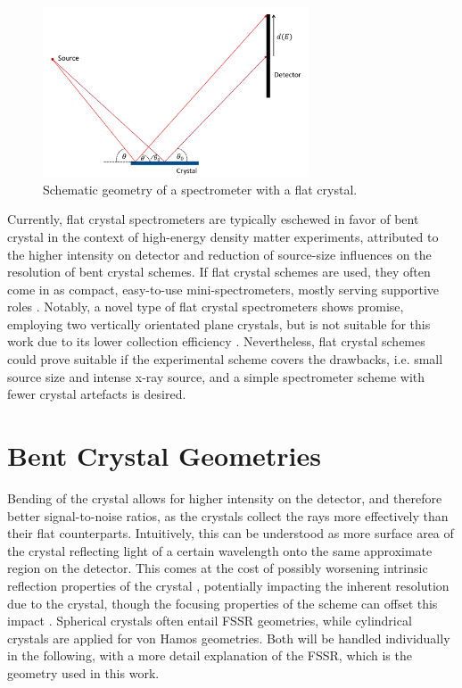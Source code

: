 \begin{figure}[H]
	\centering
	\includegraphics[width = 0.70\textwidth]{Diagrams/Basic_Spectrometer.pdf}
	\caption{Schematic geometry of a spectrometer with a flat crystal.}
	\label{BasicSpec}
\end{figure}

Currently, flat crystal spectrometers are typically eschewed in 
favor of bent 
crystal in the context of high-energy density matter experiments, 
attributed to 
the higher intensity on detector and reduction of source-size 
influences on the 
resolution of bent crystal schemes. If flat crystal schemes are 
used, they 
often come in as compact, easy-to-use mini-spectrometers, mostly 
serving 
supportive roles \citep{renner2019challenges}. Notably, a novel 
type of flat 
crystal spectrometers shows promise, employing two vertically 
orientated plane 
crystals, but is not suitable for this work due to its lower 
collection 
efficiency \citep{renner1999vertical}. Nevertheless, flat 
crystal 
schemes could prove suitable if the experimental scheme covers the 
drawbacks, 
i.e. small source size and intense x-ray source, and a simple 
spectrometer 
scheme with fewer crystal artefacts is desired.

\section{Bent Crystal Geometries}

Bending of the 
crystal allows for higher intensity on the detector, and therefore 
better 
signal-to-noise ratios, as the crystals collect the rays more 
effectively than 
their flat counterparts. Intuitively, this can be understood as more 
surface area of the crystal reflecting light of a certain wavelength 
onto the 
same approximate region on the detector. This comes at the cost of 
possibly 
worsening intrinsic reflection properties of the crystal 
\citep{holzer1998flat}, potentially impacting the inherent resolution due to the 
crystal, 
though the focusing properties of the scheme can 
offset this 
impact \citep{renner2019challenges}. Spherical crystals often entail 
FSSR 
geometries, while cylindrical crystals are applied for von Hamos 
geometries. Both will be handled individually in 
the 
following, with a more detail explanation of the FSSR, which is the geometry used in this work. 

